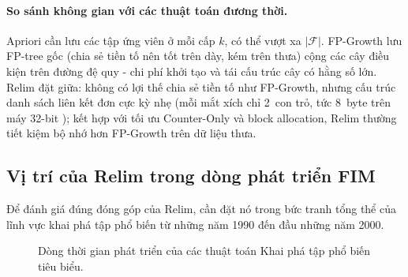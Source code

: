 \documentclass[12pt,a4paper]{report}
\begin{document}
\paragraph{So sánh không gian với các thuật toán đương thời.}
Apriori cần lưu các tập ứng viên ở mỗi cấp $k$, có thể vượt xa $|\mathcal{F}|$.
FP-Growth lưu FP-tree gốc (chia sẻ tiền tố nên tốt trên dày, kém trên thưa)
cộng các cây điều kiện trên đường đệ quy - chi phí khởi tạo và tái cấu trúc
cây có hằng số lớn. Relim đặt giữa: không có lợi thế chia sẻ tiền tố như
FP-Growth, nhưng cấu trúc danh sách liên kết đơn cực kỳ nhẹ (mỗi mắt xích chỉ
2~con trỏ, tức 8~byte trên máy 32-bit \cite[Section~2.4]{borgelt2005}); kết
hợp với tối ưu Counter-Only và block allocation, Relim thường tiết kiệm bộ nhớ
hơn FP-Growth trên dữ liệu thưa.
\subsection{Vị trí của Relim trong dòng phát triển FIM}
\label{subsec:history}
 
Để đánh giá đúng đóng góp của Relim, cần đặt nó trong bức tranh tổng thể của lĩnh
vực khai phá tập phổ biến từ những năm 1990 đến đầu những năm 2000.

\begin{figure}[H]
\centering
{}
\caption{Dòng thời gian phát triển của các thuật toán Khai phá tập phổ biến tiêu biểu.}
\label{fig:fim-timeline}
\end{figure}
 
\end{document}

